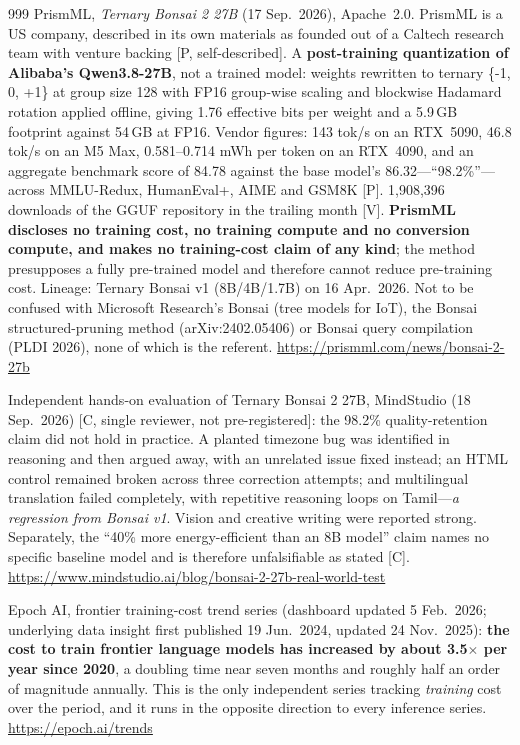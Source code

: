 \begin{thebibliography}{999}
 PrismML, \emph{Ternary Bonsai 2 27B} (17 Sep.\ 2026), Apache~2.0. PrismML is a US company, described in its own materials as founded out of a Caltech research team with venture backing [P, self-described]. A \textbf{post-training quantization of Alibaba's Qwen3.8-27B}, not a trained model: weights rewritten to ternary \{-1, 0, +1\} at group size 128 with FP16 group-wise scaling and blockwise Hadamard rotation applied offline, giving 1.76 effective bits per weight and a 5.9\,GB footprint against 54\,GB at FP16. Vendor figures: 143 tok/s on an RTX~5090, 46.8 tok/s on an M5 Max, 0.581--0.714 mWh per token on an RTX~4090, and an aggregate benchmark score of 84.78 against the base model's 86.32---``98.2\%''---across MMLU-Redux, HumanEval+, AIME and GSM8K [P]. 1,908,396 downloads of the GGUF repository in the trailing month [V]. \textbf{PrismML discloses no training cost, no training compute and no conversion compute, and makes no training-cost claim of any kind}; the method presupposes a fully pre-trained model and therefore cannot reduce pre-training cost. Lineage: Ternary Bonsai v1 (8B/4B/1.7B) on 16 Apr.\ 2026. Not to be confused with Microsoft Research's Bonsai (tree models for IoT), the Bonsai structured-pruning method (arXiv:2402.05406) or Bonsai query compilation (PLDI 2026), none of which is the referent. \url{https://prismml.com/news/bonsai-2-27b}

 Independent hands-on evaluation of Ternary Bonsai 2 27B, MindStudio (18 Sep.\ 2026) [C, single reviewer, not pre-registered]: the 98.2\% quality-retention claim did not hold in practice. A planted timezone bug was identified in reasoning and then argued away, with an unrelated issue fixed instead; an HTML control remained broken across three correction attempts; and multilingual translation failed completely, with repetitive reasoning loops on Tamil---\emph{a regression from Bonsai v1}. Vision and creative writing were reported strong. Separately, the ``40\% more energy-efficient than an 8B model'' claim names no specific baseline model and is therefore unfalsifiable as stated [C]. \url{https://www.mindstudio.ai/blog/bonsai-2-27b-real-world-test}

 Epoch AI, frontier training-cost trend series (dashboard updated 5 Feb.\ 2026; underlying data insight first published 19 Jun.\ 2024, updated 24 Nov.\ 2025): \textbf{the cost to train frontier language models has increased by about 3.5$\times$ per year since 2020}, a doubling time near seven months and roughly half an order of magnitude annually. This is the only independent series tracking \emph{training} cost over the period, and it runs in the opposite direction to every inference series. \url{https://epoch.ai/trends}


\end{thebibliography}
